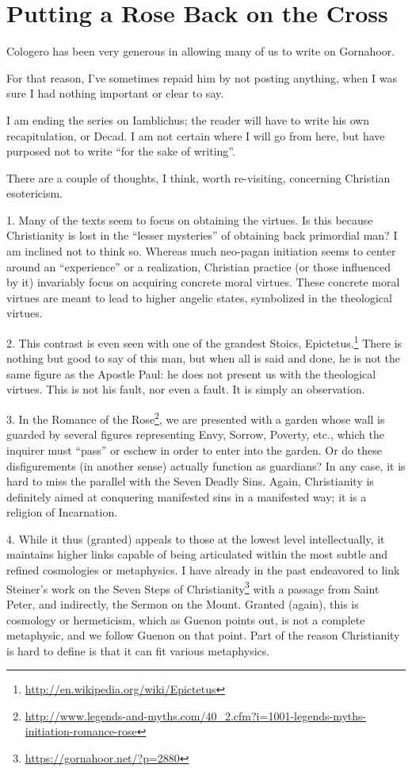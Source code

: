 \section{Putting a Rose Back on the Cross}

Cologero has been very generous in allowing many of us to write on Gornahoor.

For that reason, I've sometimes repaid him by not posting anything, when I was sure I had nothing important or clear to say.

I am ending the series on Iamblichus; the reader will have to write his own recapitulation, or Decad. I am not certain where I will go from here, but have purposed not to write ``for the sake of writing''.

There are a couple of thoughts, I think, worth re-visiting, concerning Christian esotericism.

1. Many of the texts seem to focus on obtaining the virtues. Is this because Christianity is lost in the ``lesser mysteries'' of obtaining back primordial man? I am inclined not to think so. Whereas much neo-pagan initiation seems to center around an ``experience'' or a realization, Christian practice (or those influenced by it) invariably focus on acquiring concrete moral virtues. These concrete moral virtues are meant to lead to higher angelic states, symbolized in the theological virtues.

2. This contrast is even seen with one of the grandest Stoics, Epictetus.\footnote{\url{http://en.wikipedia.org/wiki/Epictetus}} There is nothing but good to say of this man, but when all is said and done, he is not the same figure as the Apostle Paul: he does not present us with the theological virtues. This is not his fault, nor even a fault. It is simply an observation.

3. In the Romance of the Rose\footnote{\url{http://www.legends-and-myths.com/40_2.cfm?i=1001-legends-myths-initiation-romance-rose}}, we are presented with a garden whose wall is guarded by several figures representing Envy, Sorrow, Poverty, etc., which the inquirer must ``pass'' or eschew in order to enter into the garden. Or do these disfigurements (in another sense) actually function as guardians? In any case, it is hard to miss the parallel with the Seven Deadly Sins. Again, Christianity is definitely aimed at conquering manifested sins in a manifested way; it is a religion of Incarnation.

4. While it thus (granted) appeals to those at the lowest level intellectually, it maintains higher links capable of being articulated within the most subtle and refined cosmologies or metaphysics. I have already in the past endeavored to link Steiner's work on the Seven Steps of Christianity\footnote{\url{https://gornahoor.net/?p=2880}} with a passage from Saint Peter, and indirectly, the Sermon on the Mount. Granted (again), this is cosmology or hermeticism, which as Guenon points out, is not a complete metaphysic, and we follow Guenon on that point. Part of the reason Christianity is hard to define is that it can fit various metaphysics.

